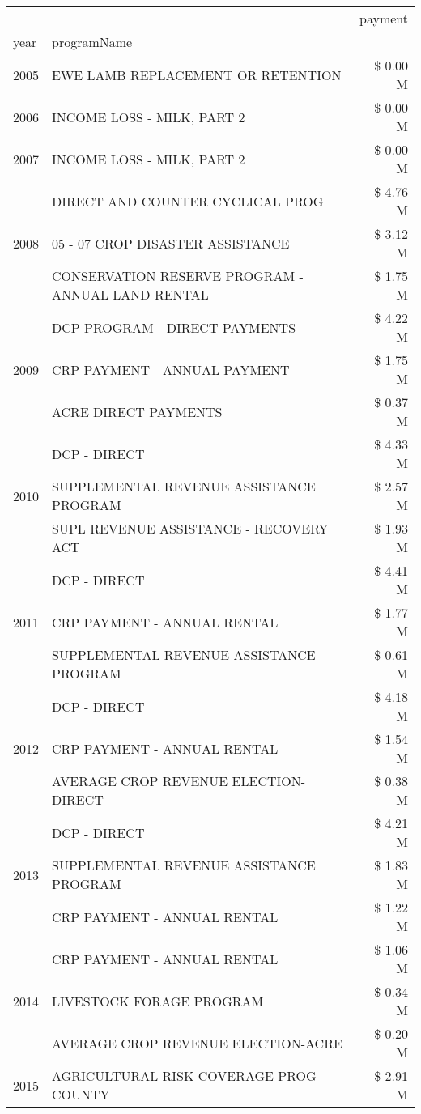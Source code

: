 \begin{tabular}{llr}
\toprule
 &  & payment \\
year & programName &  \\
\midrule
2005 & EWE LAMB REPLACEMENT OR RETENTION & \$ 0.00 M \\
\cline{1-3}
2006 & INCOME LOSS - MILK, PART 2 & \$ 0.00 M \\
\cline{1-3}
2007 & INCOME LOSS - MILK, PART 2 & \$ 0.00 M \\
\cline{1-3}
\multirow[t]{3}{*}{2008} & DIRECT AND COUNTER CYCLICAL PROG & \$ 4.76 M \\
 & 05 - 07 CROP DISASTER ASSISTANCE & \$ 3.12 M \\
 & CONSERVATION RESERVE PROGRAM - ANNUAL LAND RENTAL & \$ 1.75 M \\
\cline{1-3}
\multirow[t]{3}{*}{2009} & DCP PROGRAM - DIRECT PAYMENTS & \$ 4.22 M \\
 & CRP PAYMENT - ANNUAL PAYMENT & \$ 1.75 M \\
 & ACRE DIRECT PAYMENTS & \$ 0.37 M \\
\cline{1-3}
\multirow[t]{3}{*}{2010} & DCP - DIRECT & \$ 4.33 M \\
 & SUPPLEMENTAL REVENUE ASSISTANCE PROGRAM & \$ 2.57 M \\
 & SUPL REVENUE ASSISTANCE - RECOVERY ACT & \$ 1.93 M \\
\cline{1-3}
\multirow[t]{3}{*}{2011} & DCP - DIRECT & \$ 4.41 M \\
 & CRP PAYMENT - ANNUAL RENTAL & \$ 1.77 M \\
 & SUPPLEMENTAL REVENUE ASSISTANCE PROGRAM & \$ 0.61 M \\
\cline{1-3}
\multirow[t]{3}{*}{2012} & DCP - DIRECT & \$ 4.18 M \\
 & CRP PAYMENT - ANNUAL RENTAL & \$ 1.54 M \\
 & AVERAGE CROP REVENUE ELECTION-DIRECT & \$ 0.38 M \\
\cline{1-3}
\multirow[t]{3}{*}{2013} & DCP - DIRECT & \$ 4.21 M \\
 & SUPPLEMENTAL REVENUE ASSISTANCE PROGRAM & \$ 1.83 M \\
 & CRP PAYMENT - ANNUAL RENTAL & \$ 1.22 M \\
\cline{1-3}
\multirow[t]{3}{*}{2014} & CRP PAYMENT - ANNUAL RENTAL & \$ 1.06 M \\
 & LIVESTOCK FORAGE PROGRAM & \$ 0.34 M \\
 & AVERAGE CROP REVENUE ELECTION-ACRE & \$ 0.20 M \\
\cline{1-3}
\multirow[t]{3}{*}{2015} & AGRICULTURAL RISK COVERAGE PROG - COUNTY & \$ 2.91 M \\

\end{tabular}

